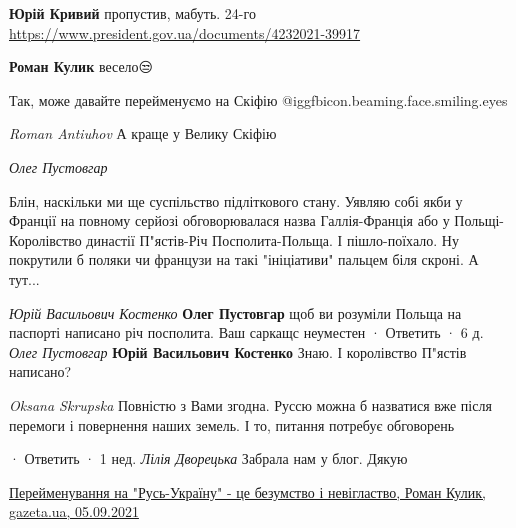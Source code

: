 \begin{itemize}
\begin{itemize}
\textbf{Юрій Кривий} пропустив, мабуть. 24-го
\url{https://www.president.gov.ua/documents/4232021-39917}

 
\textbf{Роман Кулик} весело😒
\end{itemize}

 
Так, може давайте перейменуємо на Скіфію @igg{fbicon.beaming.face.smiling.eyes} 

\begin{itemize}
\emph{Roman Antiuhov}
А краще у Велику Скіфію
\end{itemize}

\emph{Олег Пустовгар}

Блін, наскільки ми ще суспільство підліткового стану. Уявляю собі якби у Франції
на повному серйозі обговорювалася назва Галлія-Франція або у Польщі-
Королівство династії П"ястів-Річ Посполита-Польща. І пішло-поїхало. Ну
покрутили б поляки чи французи на такі "ініціативи" пальцем біля скроні. А
тут...

\begin{itemize}
\emph{Юрій Васильович Костенко}
\textbf{Олег Пустовгар} щоб ви розуміли Польща на паспорті написано річ посполита. Ваш саркащс неуместен
 · Ответить · 6 д.
\emph{Олег Пустовгар}
\textbf{Юрій Васильович Костенко} Знаю. І королівство П"ястів написано?
\end{itemize}

\emph{Oksana Skrupska}
Повністю з Вами згодна. Руссю можна б назватися вже після перемоги і повернення
наших земель. І то, питання потребує обговорень

 · Ответить · 1 нед.
\emph{Лілія Дворецька}
Забрала нам у блог. Дякую

\href{https://gazeta.ua/blog/55697/perejmenuvannya-na-rusukrayinu-ce-bezumstvo-i-neviglastvo}{%
Перейменування на "Русь-Україну" - це безумство і невігластво, Роман Кулик, gazeta.ua, 05.09.2021%
}

\end{itemize}

